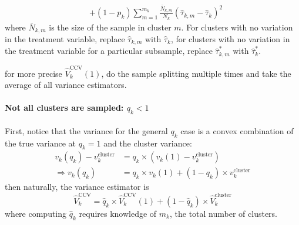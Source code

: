 \documentclass[twoside]{article}
\begin{document}
\begin{itemize}
\begin{itemize}
\begin{align*}
            & + \left(1-p_k\right) \sum^{m_k}_{m=1}\frac{\bar{N}_{k,m}}{N_k} \left(\hat{\tau}_{k,m}-\hat{\tau}_k\right)^2
        \end{align*}
        where $\bar{N}_{k,m}$ is the size of the sample in cluster $m$. For clusters with no variation in the treatment variable, replace $\hat{\tau}_{k,m}$ with $\hat{\tau}_k$, for clusters with no variation in the treatment variable for a particular subsample, replace $\hat{\tau}^*_{k,m}$ with $\hat{\tau}^*_k$.
    \end{itemize}
    for more precise $\hat{V}^{\text{CCV}}_k(1)$, do the sample splitting multiple times and take the average of all variance estimators.
\end{itemize}

\paragraph*{Not all clusters are sampled: $q_k<1$}
First, notice that the variance for the general $q_k$ case is a convex combination of the true variance at $q_k=1$ and the cluster variance:
\begin{align*}
    v_k \left(q_k\right) - v^{\text{cluster}}_k &= q_k\times \left(v_k(1) - v_k^{\text{cluster}}\right) \\
    \Rightarrow v_k \left(q_k\right) &= q_k \times v_k(1) + \left(1-q_k\right)\times v^{\text{cluster}}_k
\end{align*}
then naturally, the variance estimator is 
\begin{equation*}
    \hat{V}^{\text{CCV}}_k = \hat{q}_k \times \hat{V}^{\text{CCV}}_k(1) + \left(1-\hat{q}_k\right) \times \hat{V}^{\text{cluster}}_k
\end{equation*}
where computing $\hat{q}_k$ requires knowledge of $m_k$, the total number of clusters.
\end{document}
